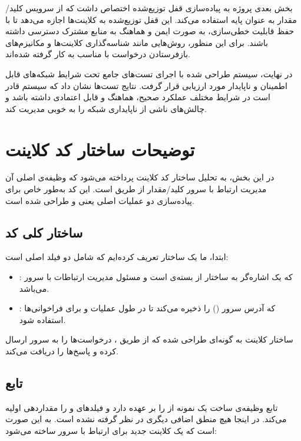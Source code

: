 بخش بعدی پروژه به پیاده‌سازی قفل توزیع‌شده اختصاص داشت که از سرویس کلید/مقدار به عنوان پایه استفاده می‌کند. این قفل توزیع‌شده به کلاینت‌ها اجازه می‌دهد تا با حفظ قابلیت خطی‌سازی، به صورت ایمن و هماهنگ به منابع مشترک دسترسی داشته باشند. برای این منظور، روش‌هایی مانند شناسه‌گذاری کلاینت‌ها و مکانیزم‌های بازفرستادن درخواست با  مناسب به کار گرفته شده‌اند.

در نهایت، سیستم طراحی شده با اجرای تست‌های جامع تحت شرایط شبکه‌های قابل اطمینان و ناپایدار مورد ارزیابی قرار گرفت. نتایج تست‌ها نشان داد که سیستم قادر است در شرایط مختلف عملکرد صحیح، هماهنگ و قابل اعتمادی داشته باشد و چالش‌های ناشی از ناپایداری شبکه را به خوبی مدیریت کند.


\section*{توضیحات ساختار کد کلاینت}

در این بخش، به تحلیل ساختار کد کلاینت  پرداخته می‌شود که وظیفه‌ی اصلی آن مدیریت ارتباط با سرور کلید/مقدار از طریق  است. این کد به‌طور خاص برای پیاده‌سازی دو عملیات اصلی یعنی  و  طراحی شده است.

\subsection*{ساختار کلی کد}

ابتدا، ما یک ساختار  تعریف کرده‌ایم که شامل دو فیلد اصلی است:
\begin{itemize}
  \item {}: که یک اشاره‌گر به ساختار  از بسته‌ی  است و مسئول مدیریت ارتباطات  با سرور می‌باشد.
  \item {}: که آدرس سرور () را ذخیره می‌کند تا در طول عملیات  و  برای فراخوانی‌ها استفاده شود.
\end{itemize}

ساختار کلاینت به گونه‌ای طراحی شده که از طریق ، درخواست‌ها را به سرور ارسال کرده و پاسخ‌ها را دریافت می‌کند.

\subsection*{تابع }

تابع  وظیفه‌ی ساخت یک نمونه از  را بر عهده دارد و فیلدهای  و  را مقداردهی اولیه می‌کند. در اینجا هیچ منطق اضافی دیگری در نظر گرفته نشده است. به این صورت است که یک کلاینت جدید برای ارتباط با سرور ساخته می‌شود:

